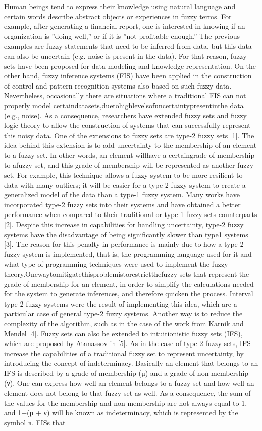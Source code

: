 Human beings tend to express their knowledge using natural language and certain words describe abstract objects or experiences in fuzzy terms. For example, after generating a ﬁnancial report, one is interested in knowing if an organization is ”doing well,” or if it is ”not proﬁtable enough.” The previous examples are fuzzy statements that need to be inferred from data, but this data can also be uncertain (e.g. noise is present in the data). For that reason, fuzzy sets have been proposed for data modeling and knowledge representation. On the other hand, fuzzy inference systems (FIS) have been applied in the construction of control and pattern recognition systems also based on such fuzzy data. Nevertheless, occasionally there are situations where a traditional FIS can not properly model certaindatasets,duetohighlevelsofuncertaintypresentinthe data (e.g., noise). As a consequence, researchers have extended fuzzy sets and fuzzy logic theory to allow the construction of systems that can successfully represent this noisy data. One of the extensions to fuzzy sets are type-2 fuzzy sets [1]. The idea behind this extension is to add uncertainty to the membership of an element to a fuzzy set. In other words, an element willhave a certaingrade of membership to afuzzy set, and this grade of membership will be represented as another fuzzy set. For example, this technique allows a fuzzy system to be more resilient to data with many outliers; it will be easier for a type-2 fuzzy system to create a generalized model of the data than a type-1 fuzzy system. Many works have incorporated type-2 fuzzy sets into their systems and have obtained a better performance when compared to their traditional or type-1 fuzzy sets counterparts [2]. Despite this increase in capabilities for handling uncertainty, type-2 fuzzy systems have the disadvantage of being signiﬁcantly slower than type1 systems [3]. The reason for this penalty in performance is mainly due to how a type-2 fuzzy system is implemented, that is, the programming language used for it and what type of programming techniques were used to implement the fuzzy theory.Onewaytomitigatethisproblemistorestrictthefuzzy sets that represent the grade of membership for an element, in order to simplify the calculations needed for the system to generate inferences, and therefore quicken the process. Interval type-2 fuzzy systems were the result of implementing this idea, which are a particular case of general type-2 fuzzy systems. Another way is to reduce the complexity of the algorithm, such as in the case of the work from Karnik and Mendel [4]. Fuzzy sets can also be extended to intuitionistic fuzzy sets (IFS), which are proposed by Atanassov in [5]. As in the case of type-2 fuzzy sets, IFS increase the capabilities of a traditional fuzzy set to represent uncertainty, by introducing the concept of indeterminacy. Basically an element that belongs to an IFS is described by a grade of membership (µ) and a grade of non-membership (ν). One can express how well an element belongs to a fuzzy set and how well an element does not belong to that fuzzy set as well. As a consequence, the sum of the values for the membership and non-membership are not always equal to 1, and 1−(µ + ν) will be known as indeterminacy, which is represented by the symbol π. FISs that 